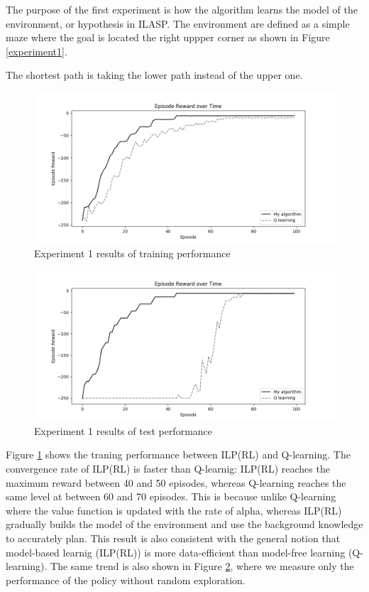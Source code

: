The purpose of the first experiment is how the algorithm learns the model of the environment, or hypothesis in ILASP.
The environment are defined as a simple maze where the goal is located the right uppper corner as shown in Figure \ref{experiment1}.

The shortest path is taking the lower path instead of the upper one.

\begin{figure}[!htb]
\centering
\includegraphics[width=1.0\textwidth]{./figures/experiment1_training}
\caption{Experiment 1 results of training performance}
\label{experiment1_training}
\end{figure}
\begin{figure}[!htb]
\centering
\includegraphics[width=1.0\textwidth]{./figures/experiment1_test}
\caption{Experiment 1 results of test performance}
\label{experiment1_test}
\end{figure}

Figure \ref{experiment1_training} shows the traning performance between ILP(RL) and Q-learning.
The convergence rate of ILP(RL) is faster than Q-learnig: ILP(RL) reaches the maximum reward between 40 and 50 episodes, whereas Q-learning reaches the same level at between 60 and 70 episodes.
This is because unlike Q-learning where the value function is updated with the rate of alpha, whereas ILP(RL) gradually builds the model of the environment and use the background knowledge to accurately plan.
This result is also consistent with the general notion that model-based learnig (ILP(RL)) is more data-efficient than model-free learning (Q-learning).
The same trend is also shown in Figure \ref{experiment1_test}, where we measure only the performance of the policy without random exploration.

